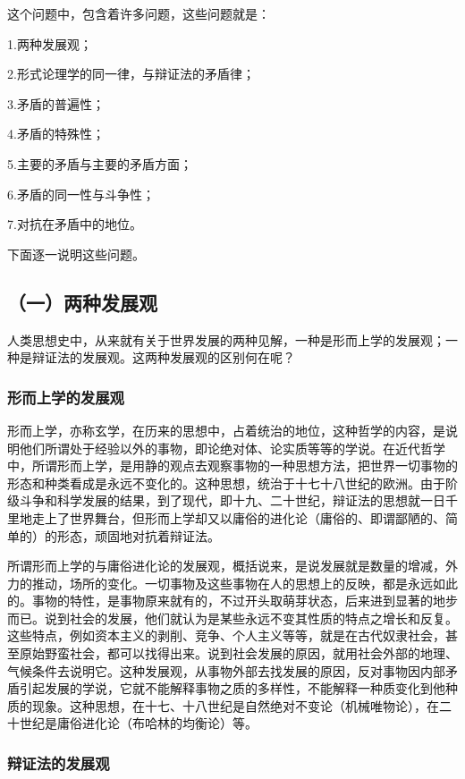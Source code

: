 这个问题中，包含着许多问题，这些问题就是：

1.两种发展观；

2.形式论理学的同一律，与辩证法的矛盾律；

3.矛盾的普遍性；

4.矛盾的特殊性；

5.主要的矛盾与主要的矛盾方面；

6.矛盾的同一性与斗争性；

7.对抗在矛盾中的地位。

下面逐一说明这些问题。

\subsection{（一）两种发展观}

人类思想史中，从来就有关于世界发展的两种见解，一种是形而上学的发展观；一种是辩证法的发展观。这两种发展观的区别何在呢？

\subsubsection{形而上学的发展观}

形而上学，亦称玄学，在历来的思想中，占着统治的地位，这种哲学的内容，是说明他们所谓处于经验以外的事物，即论绝对体、论实质等等的学说。在近代哲学中，所谓形而上学，是用静的观点去观察事物的一种思想方法，把世界一切事物的形态和种类看成是永远不变化的。这种思想，统治于十七十八世纪的欧洲。由于阶级斗争和科学发展的结果，到了现代，即十九、二十世纪，辩证法的思想就一日千里地走上了世界舞台，但形而上学却又以庸俗的进化论（庸俗的、即谓鄙陋的、简单的）的形态，顽固地对抗着辩证法。

所谓形而上学的与庸俗进化论的发展观，概括说来，是说发展就是数量的增减，外力的推动，场所的变化。一切事物及这些事物在人的思想上的反映，都是永远如此的。事物的特性，是事物原来就有的，不过开头取萌芽状态，后来进到显著的地步而已。说到社会的发展，他们就认为是某些永远不变其性质的特点之增长和反复。这些特点，例如资本主义的剥削、竞争、个人主义等等，就是在古代奴隶社会，甚至原始野蛮社会，都可以找得出来。说到社会发展的原因，就用社会外部的地理、气候条件去说明它。这种发展观，从事物外部去找发展的原因，反对事物因内部矛盾引起发展的学说，它就不能解释事物之质的多样性，不能解释一种质变化到他种质的现象。这种思想，在十七、十八世纪是自然绝对不变论（机械唯物论），在二十世纪是庸俗进化论（布哈林的均衡论）等。

\subsubsection{辩证法的发展观}

